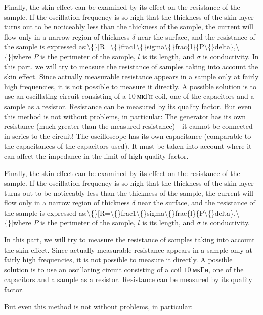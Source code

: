 \documentclass[11pt,a4paper]{article}
\begin{document}
Finally, the skin effect can be examined by its effect on the resistance of the sample. If the oscillation frequency is so high that the thickness of the skin layer turns out to be noticeably less than the thickness of the sample, the current will flow only in a narrow region of thickness $\delta$ near the surface, and the resistance of the sample is expressed as:\textbackslash\{\}[R=\textbackslash\{\}frac1\textbackslash\{\}sigma\textbackslash\{\}frac\{l\}\{P\textbackslash\{\}delta\},\textbackslash\{\}]where $P$ is the perimeter of the sample, $l$ is its length, and $\sigma$ is conductivity. In this part, we will try to measure the resistance of samples taking into account the skin effect. Since actually measurable resistance appears in a sample only at fairly high frequencies, it is not possible to measure it directly. A possible solution is to use an oscillating circuit consisting of a $10~мкГн$ coil, one of the capacitors and a sample as a resistor. Resistance can be measured by its quality factor. But even this method is not without problems, in particular: The generator has its own resistance (much greater than the measured resistance) - it cannot be connected in series to the circuit! The oscilloscope has its own capacitance (comparable to the capacitances of the capacitors used). It must be taken into account where it can affect the impedance in the limit of high quality factor.

Finally, the skin effect can be examined by its effect on the resistance of the sample. If the oscillation frequency is so high that the thickness of the skin layer turns out to be noticeably less than the thickness of the sample, the current will flow only in a narrow region of thickness $\delta$ near the surface, and the resistance of the sample is expressed as:\textbackslash\{\}[R=\textbackslash\{\}frac1\textbackslash\{\}sigma\textbackslash\{\}frac\{l\}\{P\textbackslash\{\}delta\},\textbackslash\{\}]where $P$ is the perimeter of the sample, $l$ is its length, and $\sigma$ is conductivity.

In this part, we will try to measure the resistance of samples taking into account the skin effect. Since actually measurable resistance appears in a sample only at fairly high frequencies, it is not possible to measure it directly. A possible solution is to use an oscillating circuit consisting of a coil $10~мкГн$, one of the capacitors and a sample as a resistor. Resistance can be measured by its quality factor.

But even this method is not without problems, in particular:
\end{document}
